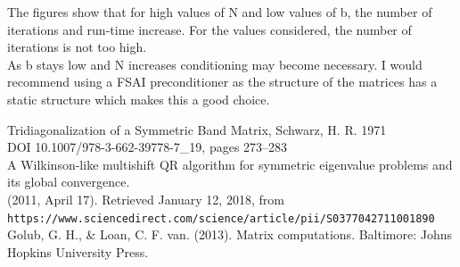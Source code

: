 \documentclass[paper=a4, fontsize=12pt]{scrartcl} %
\numberwithin{equation}{section}       %
\numberwithin{figure}{section}         %
\numberwithin{table}{section}          %
\begin{document}
The figures show that for high values of N and low values of b, the number of iterations and run-time increase. For the values considered, the number of iterations is not too high. \\
As b stays low and N increases conditioning may become necessary. I would recommend using a FSAI preconditioner as the structure of the matrices has a static structure which makes this a good choice. 

\newpage

\newpage
\begin{appendix}
\listoffigures
\listoftables

\end{appendix}
\begin{thebibliography}{3}
 Tridiagonalization of a Symmetric Band Matrix, Schwarz, H. R. 1971 \\
	DOI 10.1007/978-3-662-39778-7\_19, pages 273–283\\
 
	A Wilkinson-like multishift QR algorithm for symmetric eigenvalue problems and its global convergence. \\ (2011, April 17). Retrieved January 12, 2018, from \\  \texttt{https://www.sciencedirect.com/science/article/pii/S0377042711001890}
Golub, G. H., \& Loan, C. F. van. (2013). Matrix computations. Baltimore: Johns Hopkins University Press.

\end{thebibliography}
\end{document}
